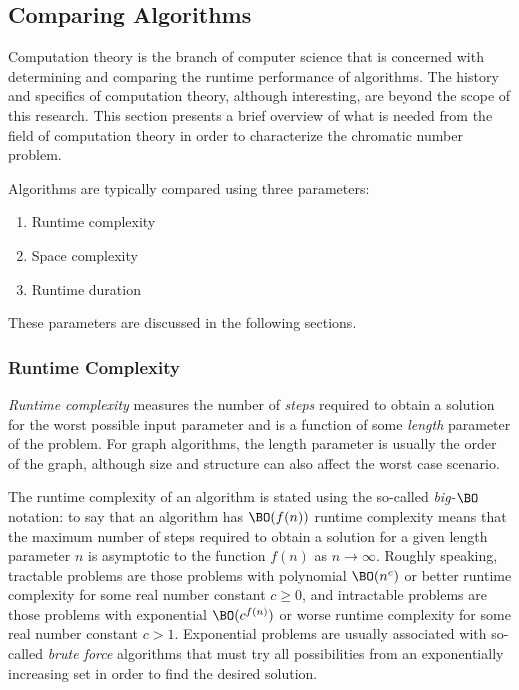 \subsection{Comparing Algorithms}\label{sec:sub:compare}

Computation theory is the branch of computer science that is concerned with determining and comparing the runtime
performance of algorithms.  The history and specifics of computation theory, although interesting, are beyond the
scope of this research.  This section presents a brief overview of what is needed from the field of computation
theory in order to characterize the chromatic number problem.

Algorithms are typically compared using three parameters:
\begin{enumerate}
\item Runtime complexity
\item Space complexity
\item Runtime duration
\end{enumerate}

These parameters are discussed in the following sections.

\subsubsection{Runtime Complexity}\label{sec:sub:sub:runtime}

\emph{Runtime complexity} measures the number of \emph{steps} required to obtain a solution for the worst possible
input parameter and is a function of some \emph{length} parameter of the problem.  For graph algorithms, the length
parameter is usually the order of the graph, although size and structure can also affect the worst case scenario.

The runtime complexity of an algorithm is stated using the so-called \emph{big-\(\BO\)} notation: to say that an
algorithm has \(\BO(f(n))\) runtime complexity means that the maximum number of steps required to obtain a solution
for a given length parameter \(n\) is asymptotic to the function \(f(n)\) as \(n\to\infty\).  Roughly speaking,
tractable problems are those problems with polynomial \(\BO(n^c)\) or better runtime complexity for some real
number constant \(c\ge0\), and intractable problems are those problems with exponential \(\BO(c^{f(n)})\) or worse
runtime complexity for some real number constant \(c>1\).  Exponential problems are usually associated with
so-called \emph{brute force} algorithms that must try all possibilities from an exponentially increasing set in
order to find the desired solution.

